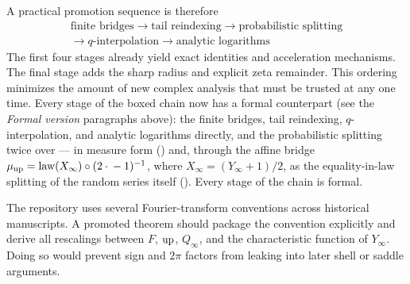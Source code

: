 \documentclass[11pt,oneside]{article}
\numberwithin{equation}{section}
\theoremstyle{definition}
\theoremstyle{remark}
\begin{document}
A practical promotion sequence is therefore
\[
 \boxed{\begin{gathered}
 \text{finite bridges}
 \longrightarrow \text{tail reindexing}
 \longrightarrow \text{probabilistic splitting}\\
 \longrightarrow \text{$q$-interpolation}
 \longrightarrow \text{analytic logarithms}
 \end{gathered}}
\]
The first four stages already yield exact identities and acceleration mechanisms.  The final
stage adds the sharp radius and explicit zeta remainder.  This ordering minimizes the amount
of new complex analysis that must be trusted at any one time.  Every stage of the boxed
chain now has a formal counterpart (see the \emph{Formal version} paragraphs above): the
finite bridges, tail reindexing, $q$-interpolation, and analytic logarithms directly, and
the probabilistic splitting twice over --- in measure form
() and, through the affine bridge
\(\mu_{\operatorname{up}}=\operatorname{law}(X_\infty)\circ(2\cdot{}-1)^{-1}\), where
\(X_\infty=(Y_\infty+1)/2\), as the equality-in-law
splitting of the random series itself ().  Every stage of the
chain is formal.

\begin{obligation}
The repository uses several Fourier-transform conventions across historical manuscripts.
A promoted theorem should package the convention explicitly and derive all rescalings between
$F$, $\operatorname{up}$, $Q_\infty$, and the characteristic function of $Y_\infty$.  Doing so would prevent
sign and $2\pi$ factors from leaking into later shell or saddle arguments.
\end{obligation}
\end{document}
